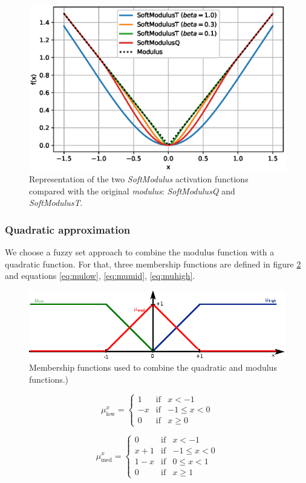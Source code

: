 \begin{figure}[h!]
	\centering
	\includegraphics[width=0.5\linewidth]{modulus/images/activations_smooth}
	\caption{Representation of the two \textit{SoftModulus} activation functions compared with the original \textit{modulus}: \textit{SoftModulusQ} and \textit{SoftModulusT}.}
	\label{fig:activationssmooth}
\end{figure}


\subsubsection{Quadratic approximation}
We choose a fuzzy set approach to combine the modulus function with a quadratic function. For that, three membership functions are defined in figure \ref{fig:fuzzy} and equations \ref{eq:mulow}, \ref{eq:mumid}, \ref{eq:muhigh}.

\begin{figure}[h!]
	\centering
	\includegraphics[width=0.7\linewidth]{modulus/images/fuzzy}
	\caption{Membership functions used to combine the quadratic and modulus functions.)}
	\label{fig:fuzzy}
\end{figure}

\begin{equation}
\label{eq:mulow}
\mu^x_{\text{low}}= \left\{ \begin{array}{lcc}
1 &   \text{if}  & x < -1 \\
-x & \text{if}  & -1 \leq x < 0 \\
0 &  \text{if} & x \geq 0
\end{array}
\right.
\end{equation}

\begin{equation}
\label{eq:mumid}
\mu^x_{\text{med}}= \left\{ \begin{array}{lcc}
0 &   \text{if}  & x < -1 \\
x+1 & \text{if}  & -1 \leq x < 0 \\
1-x & \text{if}  & 0 \leq x < 1 \\
0 &  \text{if} & x \geq 1
\end{array}
\right.
\end{equation}

